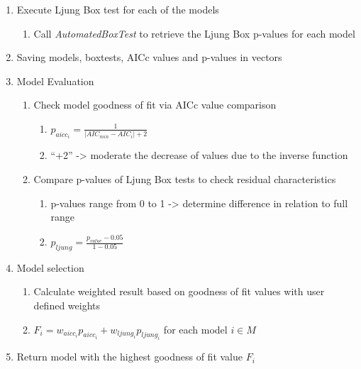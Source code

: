 \begin{enumerate}
\begin{enumerate}
\begin{enumerate}
		\end{enumerate}
		
	\end{enumerate}
	
	\item Execute Ljung Box test for each of the models
	
	\begin{enumerate}
		\item Call \textit{AutomatedBoxTest} to retrieve the Ljung Box p-values for each model
	\end{enumerate}
	
	\item Saving models, boxtests, AICc values and p-values in vectors
	
	\item Model Evaluation

	\begin{enumerate}
		
		\item Check model goodness of fit via AICc value comparison
		
		\begin{enumerate}
			\item $p_{aicc_i} = \frac{1}{| AIC_{min} - AIC_i | + 2}$
			\item ``+2'' -> moderate the decrease of values due to the inverse function
		\end{enumerate}
		
		\item Compare p-values of Ljung Box tests to check residual characteristics
		
		\begin{enumerate}
			\item p-values range from 0 to 1 -> determine difference in relation to full range
			\item $p_{ljung} = \frac{p_{value} - 0.05}{1 - 0.05}$
		\end{enumerate}
		
	\end{enumerate}

	\item Model selection

	\begin{enumerate}
		\item Calculate weighted result based on goodness of fit values with user defined weights
		\item $F_i = w_{aicc_i} p_{aicc_i} + w_{ljung_i} p_{ljung_i}$ for each model $i \in M$
	\end{enumerate}
	
	\item Return model with the highest goodness of fit value $F_i$

\end{enumerate}


